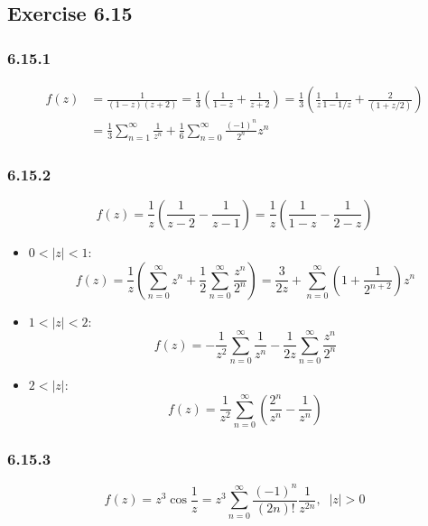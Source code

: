 \documentclass[]{ctexart}
\begin{document}
	\subsection{Exercise 6.15}
	\subsubsection*{6.15.1}
	\begin{equation*}
	\begin{split}
	f(z)&=\frac{1}{(1-z)(z+2)}=\frac 13\left(\frac{1}{1-z}+\frac{1}{z+2}\right)=\frac 13\left(\frac 1z\frac{1}{1-1/z}+\frac{2}{(1+z/2)}\right)\\
	&=\frac 13\sum_{n=1}^\infty\frac{1}{z^n}+\frac 16\sum_{n=0}^\infty\frac{(-1)^n}{2^n}z^n
	\end{split}
	\end{equation*}
	\subsubsection*{6.15.2}
	\begin{equation*}
	f(z)=\frac 1z\left(\frac{1}{z-2}-\frac{1}{z-1}\right)=\frac 1z\left(\frac{1}{1-z}-\frac{1}{2-z}\right)
	\end{equation*}
	\begin{itemize}
		\item $0<|z|<1$:
		\begin{equation*}
		f(z)=\frac 1z\left(\sum_{n=0}^\infty z^n+\frac 12\sum_{n=0}^\infty\frac{z^n}{2^n}\right)=\frac{3}{2z}+\sum_{n=0}^\infty\left(1+\frac{1}{2^{n+2}}\right)z^n
		\end{equation*}
		\item $1<|z|<2$: 
		\begin{equation*}
		f(z)=-\frac{1}{z^2}\sum_{n=0}^\infty\frac{1}{z^n}-\frac 1{2z}\sum_{n=0}^\infty\frac{z^n}{2^n}
		\end{equation*}
		\item $2<|z|$: 
		\begin{equation*}
		f(z)=\frac{1}{z^2}\sum_{n=0}^\infty\left(\frac{2^n}{z^n}-\frac{1}{z^n}\right)
		\end{equation*}
	\end{itemize}
	\subsubsection*{6.15.3}
	\begin{equation*}
	f(z)=z^3\cos\frac 1z=z^3\sum_{n=0}^\infty\frac{(-1)^n}{(2n)!}\frac{1}{z^{2n}},\;\;|z|>0
	\end{equation*}
\end{document}

